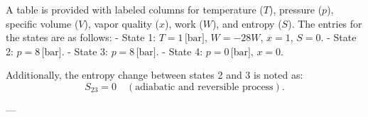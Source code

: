 A table is provided with labeled columns for temperature (\( T \)), pressure (\( p \)), specific volume (\( V \)), vapor quality (\( x \)), work (\( W \)), and entropy (\( S \)). The entries for the states are as follows:  
- State 1: \( T = 1 \, \text{[bar]} \), \( W = -28W \), \( x = 1 \), \( S = 0 \).  
- State 2: \( p = 8 \, \text{[bar]} \).  
- State 3: \( p = 8 \, \text{[bar]} \).  
- State 4: \( p = 0 \, \text{[bar]} \), \( x = 0 \).  

Additionally, the entropy change between states 2 and 3 is noted as:  
\[
S_{23} = 0 \quad (\text{adiabatic and reversible process}).
\]

---